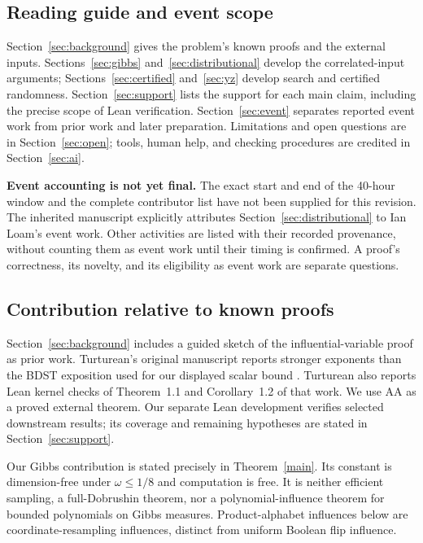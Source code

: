 \documentclass[11pt]{article}
\theoremstyle{definition}\newtheorem{definition}[theorem]{Definition}
\theoremstyle{remark}\newtheorem{remark}[theorem]{Remark}
\begin{document}
\subsection*{Reading guide and event scope}
Section~\ref{sec:background} gives the problem's known proofs and the external inputs. Sections~\ref{sec:gibbs} and~\ref{sec:distributional} develop the correlated-input arguments; Sections~\ref{sec:certified} and~\ref{sec:yz} develop search and certified randomness. Section~\ref{sec:support} lists the support for each main claim, including the precise scope of Lean verification. Section~\ref{sec:event} separates reported event work from prior work and later preparation. Limitations and open questions are in Section~\ref{sec:open}; tools, human help, and checking procedures are credited in Section~\ref{sec:ai}.

\textbf{Event accounting is not yet final.} The exact start and end of the 40-hour window and the complete contributor list have not been supplied for this revision. The inherited manuscript explicitly attributes Section~\ref{sec:distributional} to Ian Loam's event work. Other activities are listed with their recorded provenance, without counting them as event work until their timing is confirmed. A proof's correctness, its novelty, and its eligibility as event work are separate questions.

\subsection*{Contribution relative to known proofs}
Section~\ref{sec:background} includes a guided sketch of the influential-variable proof as prior work. Turturean's original manuscript reports stronger exponents than the BDST exposition used for our displayed scalar bound \cite{Tur26,BDST26}. Turturean also reports Lean kernel checks of Theorem~1.1 and Corollary~1.2 of that work. We use AA as a proved external theorem. Our separate Lean development verifies selected downstream results; its coverage and remaining hypotheses are stated in Section~\ref{sec:support}.

Our Gibbs contribution is stated precisely in Theorem~\ref{main}. Its constant is dimension-free under $\omega\leq1/8$ and computation is free. It is neither efficient sampling, a full-Dobrushin theorem, nor a polynomial-influence theorem for bounded polynomials on Gibbs measures. Product-alphabet influences below are coordinate-resampling influences, distinct from uniform Boolean flip influence.
\end{document}
